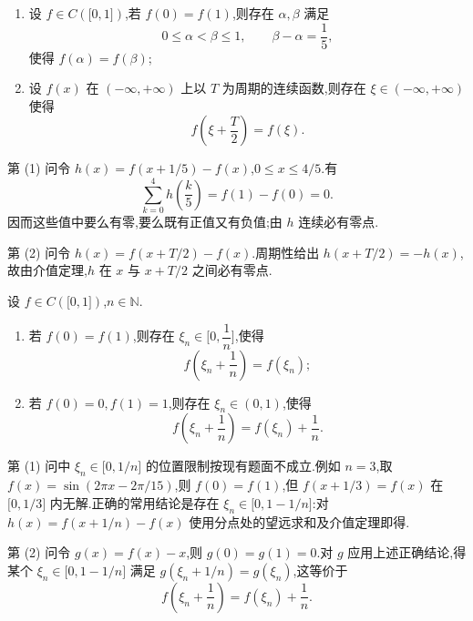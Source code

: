 \begin{example}
    \begin{enumerate}
        \item 设 $f\in C(\lbrack 0,1\rbrack)$,若 $f(0)=f(1)$,则存在 $\alpha,\beta$ 满足
              \[
                  0\leq\alpha<\beta\leq1,
                  \qquad \beta-\alpha=\dfrac{1}{5},
              \]
              使得 $f(\alpha)=f(\beta)$;
        \item 设 $f(x)$ 在 $(-\infty,+\infty)$ 上以 $T$ 为周期的连续函数,则存在 $\xi\in(-\infty,+\infty)$ 使得
              \[
                  f\left(\xi+\dfrac{T}{2}\right)=f(\xi).
              \]
    \end{enumerate}
\end{example}
\exampleblank

\begin{solution}
    第 (1) 问令 $h(x)=f(x+1/5)-f(x)$,$0\leq x\leq4/5$.有
    \[
        \sum\limits_{k=0}^{4}h\left(\dfrac{k}{5}\right)=f(1)-f(0)=0.
    \]
    因而这些值中要么有零,要么既有正值又有负值;由 $h$ 连续必有零点.

    第 (2) 问令 $h(x)=f(x+T/2)-f(x)$.周期性给出 $h(x+T/2)=-h(x)$,故由介值定理,$h$ 在 $x$ 与 $x+T/2$ 之间必有零点.
\end{solution}

\begin{example}
    设 $f\in C(\lbrack 0,1\rbrack)$,$n\in\mathbb{N}$.
    \begin{enumerate}
        \item 若 $f(0)=f(1)$,则存在 $\xi_n\in\lbrack 0,\dfrac{1}{n}\rbrack$,使得
              \[
                  f\left(\xi_n+\dfrac{1}{n}\right)=f(\xi_n);
              \]
        \item 若 $f(0)=0,f(1)=1$,则存在 $\xi_n\in(0,1)$,使得
              \[
                  f\left(\xi_n+\dfrac{1}{n}\right)=f(\xi_n)+\dfrac{1}{n}.
              \]
    \end{enumerate}
\end{example}
\exampleblank

\begin{solution}
    第 (1) 问中 $\xi_n\in\lbrack0,1/n\rbrack$ 的位置限制按现有题面不成立.例如 $n=3$,取 $f(x)=\sin(2\pi x-2\pi/15)$,则 $f(0)=f(1)$,但 $f(x+1/3)=f(x)$ 在 $\lbrack0,1/3\rbrack$ 内无解.正确的常用结论是存在 $\xi_n\in\lbrack0,1-1/n\rbrack$:对 $h(x)=f(x+1/n)-f(x)$ 使用分点处的望远求和及介值定理即得.

    第 (2) 问令 $g(x)=f(x)-x$,则 $g(0)=g(1)=0$.对 $g$ 应用上述正确结论,得某个 $\xi_n\in\lbrack0,1-1/n\rbrack$ 满足 $g(\xi_n+1/n)=g(\xi_n)$,这等价于
    \[
        f\left(\xi_n+\dfrac{1}{n}\right)=f(\xi_n)+\dfrac{1}{n}.
    \]
\end{solution}

